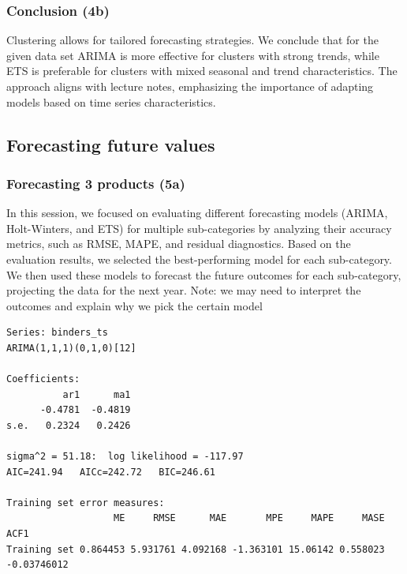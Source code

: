 \documentclass[
  letterpaper,
  DIV=11,
  numbers=noendperiod]{scrartcl}
\begin{document}
\subsubsection{Conclusion (4b)}\label{conclusion-4b}

Clustering allows for tailored forecasting strategies. We conclude that
for the given data set ARIMA is more effective for clusters with strong
trends, while ETS is preferable for clusters with mixed seasonal and
trend characteristics. The approach aligns with lecture notes,
emphasizing the importance of adapting models based on time series
characteristics.

\subsection{Forecasting future values}\label{forecasting-future-values}

\subsubsection{Forecasting 3 products
(5a)}\label{forecasting-3-products-5a}

In this session, we focused on evaluating different forecasting models
(ARIMA, Holt-Winters, and ETS) for multiple sub-categories by analyzing
their accuracy metrics, such as RMSE, MAPE, and residual diagnostics.
Based on the evaluation results, we selected the best-performing model
for each sub-category. We then used these models to forecast the future
outcomes for each sub-category, projecting the data for the next year.
Note: we may need to interpret the outcomes and explain why we pick the
certain model

\begin{verbatim}
Series: binders_ts 
ARIMA(1,1,1)(0,1,0)[12] 

Coefficients:
          ar1      ma1
      -0.4781  -0.4819
s.e.   0.2324   0.2426

sigma^2 = 51.18:  log likelihood = -117.97
AIC=241.94   AICc=242.72   BIC=246.61

Training set error measures:
                   ME     RMSE      MAE       MPE     MAPE     MASE        ACF1
Training set 0.864453 5.931761 4.092168 -1.363101 15.06142 0.558023 -0.03746012
\end{verbatim}
\end{document}
